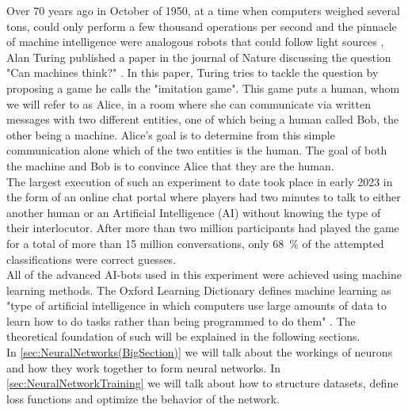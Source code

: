 Over 70 years ago in October of 1950, at a time when computers weighed several tons, could only perform a few thousand operations per second and the pinnacle of machine intelligence were analogous robots that could follow light sources \cite{FirstThinkingMachinesArticle}, Alan Turing published a paper in the journal of Nature discussing the question "Can machines think?" \cite{TuringThinkingPaper}. In this paper, Turing tries to tackle the question by proposing a game he calls the "imitation game". This game puts a human, whom we will refer to as Alice, in a room where she can communicate via written messages with two different entities, one of which being a human called Bob, the other being a machine. Alice's goal is to determine from this simple communication alone which of the two entities is the human. The goal of both the machine and Bob is to convince Alice that they are the human.\\
The largest execution of such an experiment to date took place in early 2023 in the form of an online chat portal where players had two minutes to talk to either another human or an Artificial Intelligence (AI) without knowing the type of their interlocutor. After more than two million participants had played the game for a total of more than 15 million conversations, only \SI{68}{\percent} of the attempted classifications were correct guesses.\\
All of the advanced AI-bots used in this experiment were achieved using machine learning methods. The Oxford Learning Dictionary defines machine learning as "type of artificial intelligence in which computers use large amounts of data to learn how to do tasks rather than being programmed to do them" \cite{MLDefinition}. The theoretical foundation of such will be explained in the following sections.\\
In \cref{sec:NeuralNetworks(BigSection)} we will talk about the workings of neurons and how they work together to form neural networks. In \cref{sec:NeuralNetworkTraining} we will talk about how to structure datasets, define loss functions and optimize the behavior of the network.
